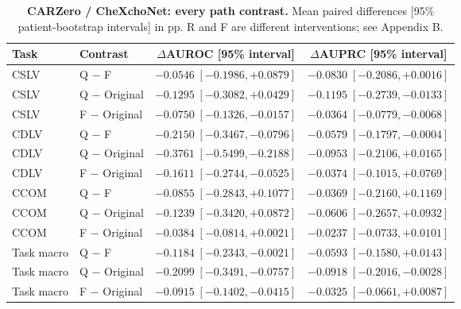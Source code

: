 \begin{table}[tp]
\centering
\caption{\textbf{CARZero / CheXchoNet: every path contrast.} Mean paired differences [95\% patient-bootstrap intervals] in pp. R and F are different interventions; see Appendix B.}
\label{tab:supp-cardiac-path-ci-carzero}
\small
\setlength{\tabcolsep}{4pt}
\begin{tabular*}{\textwidth}{@{\extracolsep{\fill}}llcc@{}}
\toprule
Task & Contrast & $\Delta$AUROC [95\% interval] & $\Delta$AUPRC [95\% interval] \\
\midrule
CSLV & Q $-$ F & $-0.0546\;[-0.1986,+0.0879]$ & $-0.0830\;[-0.2086,+0.0016]$ \\
CSLV & Q $-$ Original & $-0.1295\;[-0.3082,+0.0429]$ & $-0.1195\;[-0.2739,-0.0133]$ \\
CSLV & F $-$ Original & $-0.0750\;[-0.1326,-0.0157]$ & $-0.0364\;[-0.0779,-0.0068]$ \\
CDLV & Q $-$ F & $-0.2150\;[-0.3467,-0.0796]$ & $-0.0579\;[-0.1797,-0.0004]$ \\
CDLV & Q $-$ Original & $-0.3761\;[-0.5499,-0.2188]$ & $-0.0953\;[-0.2106,+0.0165]$ \\
CDLV & F $-$ Original & $-0.1611\;[-0.2744,-0.0525]$ & $-0.0374\;[-0.1015,+0.0769]$ \\
CCOM & Q $-$ F & $-0.0855\;[-0.2843,+0.1077]$ & $-0.0369\;[-0.2160,+0.1169]$ \\
CCOM & Q $-$ Original & $-0.1239\;[-0.3420,+0.0872]$ & $-0.0606\;[-0.2657,+0.0932]$ \\
CCOM & F $-$ Original & $-0.0384\;[-0.0814,+0.0021]$ & $-0.0237\;[-0.0733,+0.0101]$ \\
Task macro & Q $-$ F & $-0.1184\;[-0.2343,-0.0021]$ & $-0.0593\;[-0.1580,+0.0143]$ \\
Task macro & Q $-$ Original & $-0.2099\;[-0.3491,-0.0757]$ & $-0.0918\;[-0.2016,-0.0028]$ \\
Task macro & F $-$ Original & $-0.0915\;[-0.1402,-0.0415]$ & $-0.0325\;[-0.0661,+0.0087]$ \\
\bottomrule
\end{tabular*}
\end{table}

